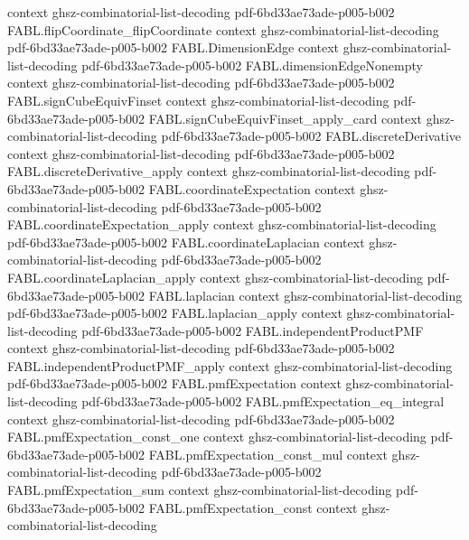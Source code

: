 \begin{theorem}
  {context}
  {ghsz-combinatorial-list-decoding}
  {pdf-6bd33ae73ade-p005-b002}
\proofstep
  {FABL.flipCoordinate_flipCoordinate}
  {context}
  {ghsz-combinatorial-list-decoding}
  {pdf-6bd33ae73ade-p005-b002}
\proofstep
  {FABL.DimensionEdge}
  {context}
  {ghsz-combinatorial-list-decoding}
  {pdf-6bd33ae73ade-p005-b002}
\proofstep
  {FABL.dimensionEdgeNonempty}
  {context}
  {ghsz-combinatorial-list-decoding}
  {pdf-6bd33ae73ade-p005-b002}
\proofstep
  {FABL.signCubeEquivFinset}
  {context}
  {ghsz-combinatorial-list-decoding}
  {pdf-6bd33ae73ade-p005-b002}
\proofstep
  {FABL.signCubeEquivFinset_apply_card}
  {context}
  {ghsz-combinatorial-list-decoding}
  {pdf-6bd33ae73ade-p005-b002}
\proofstep
  {FABL.discreteDerivative}
  {context}
  {ghsz-combinatorial-list-decoding}
  {pdf-6bd33ae73ade-p005-b002}
\proofstep
  {FABL.discreteDerivative_apply}
  {context}
  {ghsz-combinatorial-list-decoding}
  {pdf-6bd33ae73ade-p005-b002}
\proofstep
  {FABL.coordinateExpectation}
  {context}
  {ghsz-combinatorial-list-decoding}
  {pdf-6bd33ae73ade-p005-b002}
\proofstep
  {FABL.coordinateExpectation_apply}
  {context}
  {ghsz-combinatorial-list-decoding}
  {pdf-6bd33ae73ade-p005-b002}
\proofstep
  {FABL.coordinateLaplacian}
  {context}
  {ghsz-combinatorial-list-decoding}
  {pdf-6bd33ae73ade-p005-b002}
\proofstep
  {FABL.coordinateLaplacian_apply}
  {context}
  {ghsz-combinatorial-list-decoding}
  {pdf-6bd33ae73ade-p005-b002}
\proofstep
  {FABL.laplacian}
  {context}
  {ghsz-combinatorial-list-decoding}
  {pdf-6bd33ae73ade-p005-b002}
\proofstep
  {FABL.laplacian_apply}
  {context}
  {ghsz-combinatorial-list-decoding}
  {pdf-6bd33ae73ade-p005-b002}
\proofstep
  {FABL.independentProductPMF}
  {context}
  {ghsz-combinatorial-list-decoding}
  {pdf-6bd33ae73ade-p005-b002}
\proofstep
  {FABL.independentProductPMF_apply}
  {context}
  {ghsz-combinatorial-list-decoding}
  {pdf-6bd33ae73ade-p005-b002}
\proofstep
  {FABL.pmfExpectation}
  {context}
  {ghsz-combinatorial-list-decoding}
  {pdf-6bd33ae73ade-p005-b002}
\proofstep
  {FABL.pmfExpectation_eq_integral}
  {context}
  {ghsz-combinatorial-list-decoding}
  {pdf-6bd33ae73ade-p005-b002}
\proofstep
  {FABL.pmfExpectation_const_one}
  {context}
  {ghsz-combinatorial-list-decoding}
  {pdf-6bd33ae73ade-p005-b002}
\proofstep
  {FABL.pmfExpectation_const_mul}
  {context}
  {ghsz-combinatorial-list-decoding}
  {pdf-6bd33ae73ade-p005-b002}
\proofstep
  {FABL.pmfExpectation_sum}
  {context}
  {ghsz-combinatorial-list-decoding}
  {pdf-6bd33ae73ade-p005-b002}
\proofstep
  {FABL.pmfExpectation_const}
  {context}
  {ghsz-combinatorial-list-decoding}

\end{theorem}
